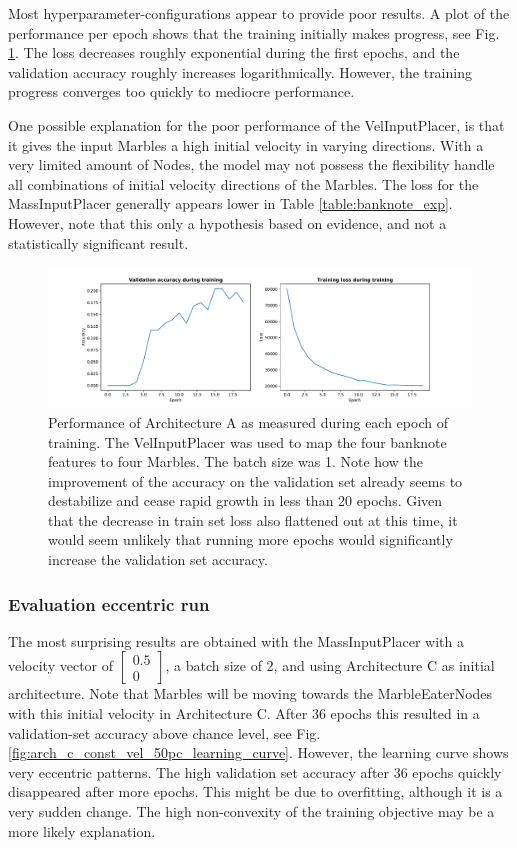 Most hyperparameter-configurations appear to provide poor results. 
A plot of the performance per epoch shows that the training initially makes progress, 
see Fig. \ref{fig:velinputplacer_performance}. 
The loss decreases roughly exponential during the first epochs, and the validation accuracy roughly increases logarithmically. 
However, the training progress converges too quickly to mediocre performance. 

One possible explanation for the poor performance of the VelInputPlacer, 
is that it gives the input Marbles a high initial velocity in varying directions. 
With a very limited amount of Nodes,
the model may not possess the flexibility handle all combinations of initial velocity directions of the Marbles.
The loss for the MassInputPlacer generally appears lower in Table \ref{table:banknote_exp}.
However, note that this only a hypothesis based on evidence, and not a statistically significant result.

\begin{figure}[hb]
	\centering
	\includegraphics[scale=0.4]{figures/A_batch1_velinputplacer.pdf}
	\caption{Performance of Architecture A as measured during each epoch of training. The VelInputPlacer was used to map the four banknote features to four Marbles. The batch size was 1. Note how the improvement of the accuracy on the validation set already seems to destabilize and cease rapid growth in less than 20 epochs. Given that the decrease in train set loss also flattened out at this time, it would seem unlikely that running more epochs would significantly increase the validation set accuracy.}
	\label{fig:velinputplacer_performance}
\end{figure}

\clearpage

\subsubsection{Evaluation eccentric run}
The most surprising results are obtained with the MassInputPlacer with a velocity vector of $\begin{bmatrix} 0.5\\0\end{bmatrix}$, 
a batch size of 2, and using Architecture C as initial architecture. 
Note that Marbles will be moving towards the MarbleEaterNodes with this initial velocity in Architecture C. 
After 36 epochs this resulted in a validation-set accuracy above chance level, see Fig. \ref{fig:arch_c_const_vel_50pc_learning_curve}. 
However, the learning curve shows very eccentric patterns. 
The high validation set accuracy after 36 epochs quickly disappeared after more epochs. 
This might be due to overfitting, although it is a very sudden change. 
The high non-convexity of the training objective may be a more likely explanation. 

